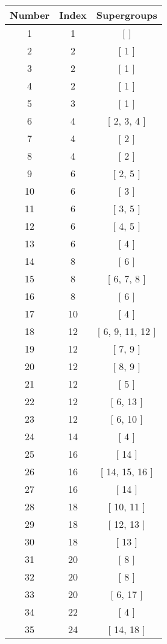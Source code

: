 \begin{center}
\begin{longtable}[H]{|| c c c ||}
\hline
Number & Index & Supergroups \\ 
\hline
1 & 1 & [ ] \\ 
\hline
2 & 2 & [ 1 ] \\ 
\hline
3 & 2 & [ 1 ] \\ 
\hline
4 & 2 & [ 1 ] \\ 
\hline
5 & 3 & [ 1 ] \\ 
\hline
6 & 4 & [ 2, 3, 4 ] \\ 
\hline
7 & 4 & [ 2 ] \\ 
\hline
8 & 4 & [ 2 ] \\ 
\hline
9 & 6 & [ 2, 5 ] \\ 
\hline
10 & 6 & [ 3 ] \\ 
\hline
11 & 6 & [ 3, 5 ] \\ 
\hline
12 & 6 & [ 4, 5 ] \\ 
\hline
13 & 6 & [ 4 ] \\ 
\hline
14 & 8 & [ 6 ] \\ 
\hline
15 & 8 & [ 6, 7, 8 ] \\ 
\hline
16 & 8 & [ 6 ] \\ 
\hline
17 & 10 & [ 4 ] \\ 
\hline
18 & 12 & [ 6, 9, 11, 12 ] \\ 
\hline
19 & 12 & [ 7, 9 ] \\ 
\hline
20 & 12 & [ 8, 9 ] \\ 
\hline
21 & 12 & [ 5 ] \\ 
\hline
22 & 12 & [ 6, 13 ] \\ 
\hline
23 & 12 & [ 6, 10 ] \\ 
\hline
24 & 14 & [ 4 ] \\ 
\hline
25 & 16 & [ 14 ] \\ 
\hline
26 & 16 & [ 14, 15, 16 ] \\ 
\hline
27 & 16 & [ 14 ] \\ 
\hline
28 & 18 & [ 10, 11 ] \\ 
\hline
29 & 18 & [ 12, 13 ] \\ 
\hline
30 & 18 & [ 13 ] \\ 
\hline
31 & 20 & [ 8 ] \\ 
\hline
32 & 20 & [ 8 ] \\ 
\hline
33 & 20 & [ 6, 17 ] \\ 
\hline
34 & 22 & [ 4 ] \\ 
\hline
35 & 24 & [ 14, 18 ] \\ 

\end{longtable}
\end{center}
